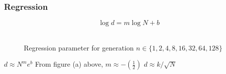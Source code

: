 \documentclass[aspectratio=169]{beamer}
\begin{document}
  \begin{frame}
    \frametitle{Regression}
    {
    \[\log d = m \log N + b\]
    \mbox{}\\[-0.5in]
    \begin{figure}[!ht]
      \begin{center}
	\hspace{5pt}
	\caption[]{Regression parameter for generation $n \in \{1, 2, 4, 8, 16, 32, 64, 128\}$ }	
      \end{center}
    \end{figure}
    $d \approx N^m e^b$
    \newline
    From figure (a) above, $m \approx -(\frac{1}{2})$ 
    \newline
    $d \approx k / \sqrt{N}$
    }
  \end{frame}  
  
\end{document}
